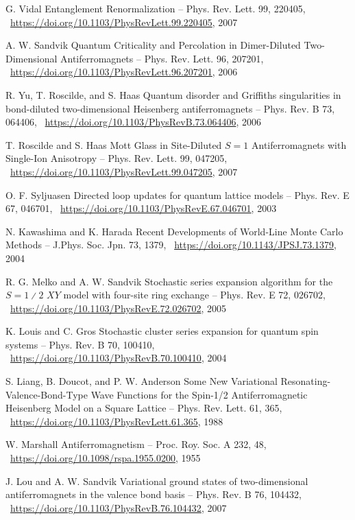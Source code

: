 \documentclass[11pt]{article}
\begin{document}
\begin{thebibliography}{3}
G. Vidal Entanglement Renormalization -- Phys. Rev. Lett. 99, 220405, ~\url{https://doi.org/10.1103/PhysRevLett.99.220405}, 2007

A. W. Sandvik Quantum Criticality and Percolation in Dimer-Diluted Two-Dimensional Antiferromagnets -- Phys. Rev. Lett. 96, 207201,  ~\url{https://doi.org/10.1103/PhysRevLett.96.207201}, 2006

R. Yu, T. Roscilde, and S. Haas Quantum disorder and Griffiths singularities in bond-diluted two-dimensional Heisenberg antiferromagnets -- Phys. Rev. B 73, 064406,  ~\url{https://doi.org/10.1103/PhysRevB.73.064406}, 2006

T. Roscilde and S. Haas Mott Glass in Site-Diluted $S=1$ Antiferromagnets with Single-Ion Anisotropy -- Phys. Rev. Lett. 99, 047205,  ~\url{https://doi.org/10.1103/PhysRevLett.99.047205}, 2007

O. F. Syljuasen Directed loop updates for quantum lattice models -- Phys. Rev. E 67, 046701,  ~\url{https://doi.org/10.1103/PhysRevE.67.046701}, 2003

N. Kawashima and K. Harada Recent Developments of World-Line Monte Carlo Methods -- J.Phys. Soc. Jpn. 73, 1379,  ~\url{https://doi.org/10.1143/JPSJ.73.1379}, 2004

R. G. Melko and A. W. Sandvik Stochastic series expansion algorithm for the $S=1∕2$ $XY$ model with four-site ring exchange -- Phys. Rev. E 72, 026702,  ~\url{https://doi.org/10.1103/PhysRevE.72.026702}, 2005

K. Louis and C. Gros Stochastic cluster series expansion for quantum spin systems -- Phys. Rev. B 70, 100410,  ~\url{https://doi.org/10.1103/PhysRevB.70.100410}, 2004

S. Liang, B. Doucot, and P. W. Anderson Some New Variational Resonating-Valence-Bond-Type Wave Functions for the Spin-1/2 Antiferromagnetic Heisenberg Model on a Square Lattice -- Phys. Rev. Lett. 61, 365,  ~\url{https://doi.org/10.1103/PhysRevLett.61.365}, 1988

W. Marshall Antiferromagnetism -- Proc. Roy. Soc. A 232, 48,  ~\url{https://doi.org/10.1098/rspa.1955.0200}, 1955

J. Lou and A. W. Sandvik Variational ground states of two-dimensional antiferromagnets in the valence bond basis -- Phys. Rev. B 76, 104432, ~\url{https://doi.org/10.1103/PhysRevB.76.104432},  2007


\end{thebibliography}
\end{document}
